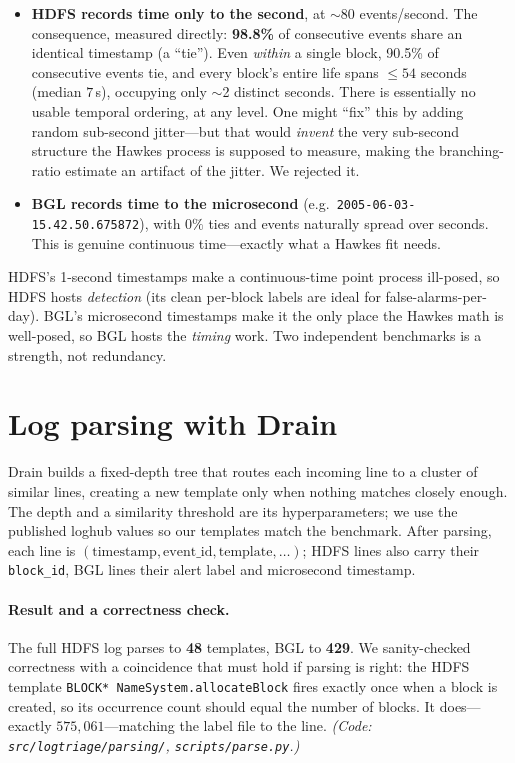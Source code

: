 \documentclass[11pt,a4paper]{article}
\newcommand{\code}[1]{\texttt{\small #1}}
\begin{document}
\begin{itemize}[nosep,leftmargin=1.5em]
  \item \textbf{HDFS records time only to the second}, at $\sim$80 events/second.
  The consequence, measured directly: \textbf{98.8\%} of consecutive events share
  an identical timestamp (a ``tie''). Even \emph{within} a single block, 90.5\% of
  consecutive events tie, and every block's entire life spans $\leq 54$ seconds
  (median $7$\,s), occupying only $\sim$2 distinct seconds. There is essentially
  no usable temporal ordering, at any level. One might ``fix'' this by adding
  random sub-second jitter---but that would \emph{invent} the very sub-second
  structure the Hawkes process is supposed to measure, making the branching-ratio
  estimate an artifact of the jitter. We rejected it.
  \item \textbf{BGL records time to the microsecond}
  (e.g.\ \code{2005-06-03-15.42.50.675872}), with $0\%$ ties and events naturally
  spread over seconds. This is genuine continuous time---exactly what a Hawkes fit
  needs.
\end{itemize}

\begin{takeaway}
HDFS's 1-second timestamps make a continuous-time point process ill-posed, so
HDFS hosts \emph{detection} (its clean per-block labels are ideal for
false-alarms-per-day). BGL's microsecond timestamps make it the only place the
Hawkes math is well-posed, so BGL hosts the \emph{timing} work. Two independent
benchmarks is a strength, not redundancy.
\end{takeaway}

\section{Log parsing with Drain}
\label{sec:parsing}

Drain builds a fixed-depth tree that routes each incoming line to a cluster of
similar lines, creating a new template only when nothing matches closely enough.
The depth and a similarity threshold are its hyperparameters; we use the published
loghub values so our templates match the benchmark. After parsing, each line is
$(\text{timestamp},\text{event\_id},\text{template},\dots)$; HDFS lines also carry
their \code{block\_id}, BGL lines their alert label and microsecond timestamp.

\paragraph{Result and a correctness check.} The full HDFS log parses to
\textbf{48} templates, BGL to \textbf{429}. We sanity-checked correctness with a
coincidence that must hold if parsing is right: the HDFS template
\code{BLOCK* NameSystem.allocateBlock} fires exactly once when a block is created,
so its occurrence count should equal the number of blocks. It does---exactly
$575{,}061$---matching the label file to the line. \emph{(Code:
\code{src/logtriage/parsing/}, \code{scripts/parse.py}.)}
\end{document}
